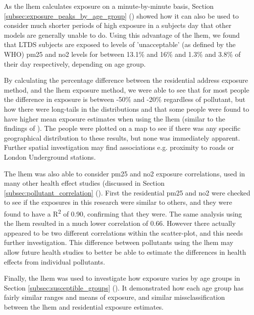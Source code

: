 
As the \gls{lhem} calculates exposure on a minute-by-minute basis, Section \ref{subsec:exposure_peaks_by_age_group} () showed how it can also be used to consider much shorter periods of high exposure in a subjects day that other models are generally unable to do. Using this advantage of the \gls{lhem}, we found that  LTDS subjects are exposed to levels of 'unacceptable' (as defined by the WHO) \gls{pm25} and \gls{no2} levels for between 13.1\% and 16\% and 1.3\% and 3.8\% of their day respectively, depending on age group.


By calculating the percentage difference between the residential address exposure method, and the \gls{lhem} exposure method, we were able to see that for most people the difference in exposure is between -50\% and -20\% regardless of pollutant, but how there were long-tails in the distributions and that some people were found to have higher mean exposure estimates when using the \gls{lhem} (similar to the findings of \cite{Reis2018}). The people were plotted on a map to see if there was any specific geographical distribution to these results, but none was immediately apparent. Further spatial investigation may find associations e.g. proximity to roads or London Underground stations.


The \gls{lhem} was also able to consider \gls{pm25} and \gls{no2} exposure correlations, used in many other health effect studies (discussed in Section \ref{subsec:pollutant_correlation} (). First the residential \gls{pm25} and \gls{no2} were checked to see if the exposures in this research were similar to others, and they were found to have a R\textsuperscript{2} of 0.90, confirming that they were. The same analysis using the \gls{lhem} resulted in a much lower correlation of 0.66. However there actually appeared to be two different correlations within the scatter-plot, and this needs further investigation. This difference between pollutants using the \gls{lhem} may allow future health studies to better be able to estimate the differences in health effects from individual pollutants.


Finally, the \gls{lhem} was used to investigate how exposure varies by age groups in Section \ref{subsec:susceptible_groups} (). It demonstrated how each age group has fairly similar ranges and means of exposure, and similar missclassification between the \gls{lhem} and residential exposure estimates.